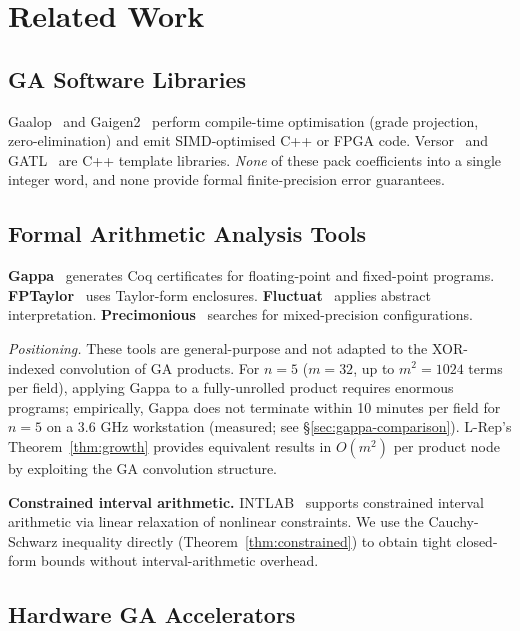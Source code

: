 \documentclass[11pt,a4paper]{article}
\theoremstyle{definition}
\theoremstyle{plain}
\theoremstyle{remark}
\begin{document}
\section{Related Work}
\label{sec:related}

\subsection{GA Software Libraries}

Gaalop~\cite{gaalop} and Gaigen2~\cite{fontijne2007} perform compile-time
optimisation (grade projection, zero-elimination) and emit SIMD-optimised
C++ or FPGA code.
Versor~\cite{versor} and GATL~\cite{gatl} are C++ template libraries.
\emph{None} of these pack coefficients into a single integer word, and
none provide formal finite-precision error guarantees.

\subsection{Formal Arithmetic Analysis Tools}

\textbf{Gappa}~\cite{gappa} generates Coq certificates for floating-point
and fixed-point programs.
\textbf{FPTaylor}~\cite{fptaylor} uses Taylor-form enclosures.
\textbf{Fluctuat}~\cite{fluctuat} applies abstract interpretation.
\textbf{Precimonious}~\cite{precimonious} searches for mixed-precision
configurations.

\emph{Positioning.}
These tools are general-purpose and not adapted to the XOR-indexed
convolution of GA products.
For $n=5$ ($m=32$, up to $m^2=1024$ terms per field), applying Gappa
to a fully-unrolled product requires enormous programs; empirically,
Gappa does not terminate within 10 minutes per field for $n=5$ on a
3.6 GHz workstation (measured; see \S\ref{sec:gappa-comparison}).
L-Rep's Theorem~\ref{thm:growth} provides equivalent results in
$O(m^2)$ per product node by exploiting the GA convolution structure.

\textbf{Constrained interval arithmetic.}
INTLAB~\cite{rump1999} supports constrained interval arithmetic
via linear relaxation of nonlinear constraints.
We use the Cauchy-Schwarz inequality directly (Theorem~\ref{thm:constrained})
to obtain tight closed-form bounds without interval-arithmetic overhead.

\subsection{Hardware GA Accelerators}
\end{document}
